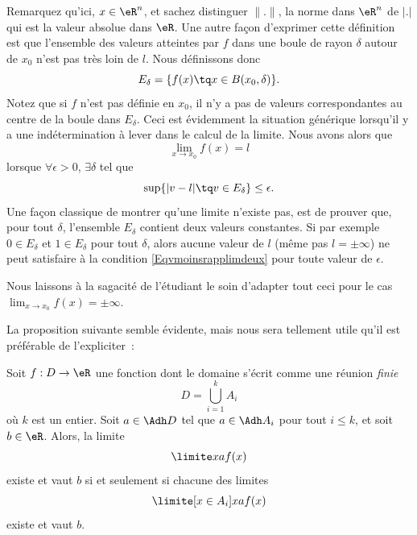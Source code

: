 Remarquez qu'ici, $x\in\eR^n$, et sachez distinguer $\| . \|$, la norme dans $\eR^n$ de $| . |$ qui est la valeur absolue dans $\eR$. Une autre façon d'exprimer cette définition est que l'ensemble des valeurs atteintes par $f$ dans une boule de rayon $\delta$ autour de $x_0$ n'est pas très loin de $l$. Nous définissons donc
\begin{equation}
    E_{\delta}=\{ f(x)\tq x\in B(x_0,\delta) \}.
\end{equation}
Notez que si $f$ n'est pas définie en $x_0$, il n'y a pas de valeurs correspondantes au centre de la boule dans $E_{\delta}$. Ceci est évidemment la situation générique lorsqu'il y a une indétermination à lever dans le calcul de la limite. Nous avons alors que
\begin{equation}
    \lim_{x\to x_0}f(x)=l
\end{equation}
lorsque $\forall\epsilon>0$, $\exists\delta$ tel que
\begin{equation}        \label{Eqvmoinsrapplimdeux}
    \sup\{ | v-l |\tq v\in E_{\delta} \}\leq\epsilon.
\end{equation}
Une façon classique de montrer qu'une limite n'existe pas, est de prouver que, pour tout $\delta$, l'ensemble $E_{\delta}$ contient deux valeurs constantes. Si par exemple $0\in E_{\delta}$ et $1\in E_{\delta}$ pour tout $\delta$, alors aucune valeur de $l$ (même pas $l=\pm\infty$) ne peut satisfaire à la condition \eqref{Eqvmoinsrapplimdeux} pour toute valeur de $\epsilon$.

Nous laissons à la sagacité de l'étudiant le soin d'adapter tout ceci pour le cas $\lim_{x\to x_0}f(x)=\pm\infty$.

La proposition suivante semble évidente, mais nous sera tellement
utile qu'il est préférable de l'expliciter~:
\begin{proposition}
Soit $f : D \to \eR$ une fonction dont le domaine
  s'écrit comme une réunion \emph{finie}
  \begin{equation*}
    D = \bigcup_{i=1}^k A_i
  \end{equation*}
  où $k$ est un entier. Soit $a \in \Adh D$ tel que $a \in \Adh A_i$
  pour tout $i \leq k$, et soit $b \in \eR$. Alors, la limite
  \begin{equation*}
    \limite x a f(x)
  \end{equation*}
  existe et vaut $b$ si et seulement si chacune des limites
  \begin{equation*}
    \limite[x \in A_i] x a f(x)
  \end{equation*}
  existe et vaut $b$.
\end{proposition}

